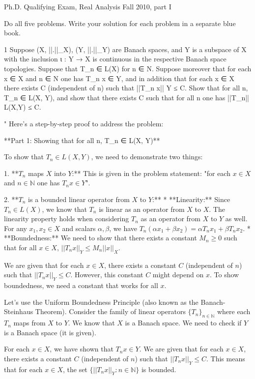 Ph.D. Qualifying Exam, Real Analysis
Fall 2010, part I

Do all five problems. Write your solution for each problem in a separate blue book.

1 Suppose (X, ||.||_X), (Y, ||.||_Y) are Banach spaces, and Y is a subspace of X with the inclusion ι :
Y → X is continuous in the respective Banach space topologies. Suppose that T_n ∈ L(X) for n ∈ N.
Suppose moreover that for each x ∈ X and n ∈ N one has T_n x ∈ Y, and in addition that for each
x ∈ X there exists C (independent of n) such that ||T_n x|| Y ≤ C. Show that for all n, T_n ∈ L(X, Y),
and show that there exists C such that for all n one has ||T_n|| L(X,Y) ≤ C.

"
Here's a step-by-step proof to address the problem:

**Part 1: Showing that for all n, T_n ∈ L(X, Y)**

To show that $T_n \in L(X, Y)$, we need to demonstrate two things:

1.  **$T_n$ maps $X$ into $Y$:** This is given in the problem statement: "for each $x \in X$ and $n \in \mathbb{N}$ one has $T_n x \in Y$".

2.  **$T_n$ is a bounded linear operator from $X$ to $Y$:**
    * **Linearity:** Since $T_n \in L(X)$, we know that $T_n$ is linear as an operator from $X$ to $X$. The linearity property holds when considering $T_n$ as an operator from $X$ to $Y$ as well. For any $x_1, x_2 \in X$ and scalars $\alpha, \beta$, we have $T_n(\alpha x_1 + \beta x_2) = \alpha T_n x_1 + \beta T_n x_2$.
    * **Boundedness:** We need to show that there exists a constant $M_n \ge 0$ such that for all $x \in X$, $||T_n x||_Y \le M_n ||x||_X$.

    We are given that for each $x \in X$, there exists a constant $C$ (independent of $n$) such that $||T_n x||_Y \le C$. However, this constant $C$ might depend on $x$. To show boundedness, we need a constant that works for all $x$.

    Let's use the Uniform Boundedness Principle (also known as the Banach-Steinhaus Theorem). Consider the family of linear operators $\{T_n\}_{n \in \mathbb{N}}$ where each $T_n$ maps from $X$ to $Y$. We know that $X$ is a Banach space. We need to check if $Y$ is a Banach space (it is given).

    For each $x \in X$, we have shown that $T_n x \in Y$. We are given that for each $x \in X$, there exists a constant $C$ (independent of $n$) such that $||T_n x||_Y \le C$. This means that for each $x \in X$, the set $\{||T_n x||_Y : n \in \mathbb{N}\}$ is bounded.

